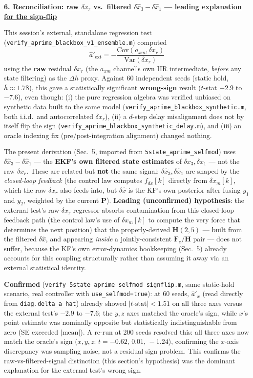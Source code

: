 \documentclass[11pt,a4paper,fontset=none]{ctexart}
\newcommand{\dxh}{\delta\hat x}
\newcommand{\dxr}{\delta x_r}
\newcommand{\hd}[1]{\par\medskip\noindent\underline{\textbf{#1}}\par\nobreak\vspace{0.3ex}}
\begin{document}
\newpage
\hd{6. Reconciliation: raw $\dxr$ vs.\ filtered $\dxh_3-\dxh_1$ --- leading explanation for the sign-flip}
This session's external, standalone regression test (\texttt{verify\_aprime\_blackbox\_v1\_ensemble.m}) computed
\[ \hat a'_{\text{ext}} = -\frac{\mathrm{Cov}(a_{xm},\dxr)}{\mathrm{Var}(\dxr)} \]
using the \textbf{raw} residual $\dxr$ (the $a_{xm}$ channel's own IIR intermediate, \emph{before} any state filtering) as the $\Delta h$ proxy. Against 60 independent seeds (static hold, $\bar h\approx1.78$), this gave a statistically significant \textbf{wrong-sign} result ($t$-stat $-2.9$ to $-7.6$), even though: (i) the pure regression algebra was verified unbiased on synthetic data built to the same model (\texttt{verify\_aprime\_blackbox\_synthetic.m}, both i.i.d.\ and autocorrelated $\dxr$), (ii) a $d$-step delay misalignment does not by itself flip the sign (\texttt{verify\_aprime\_blackbox\_synthetic\_delay.m}), and (iii) an oracle indexing fix (pre/post-integration alignment) changed nothing.

The present derivation (Sec.~5, imported from \texttt{5state\_aprime\_selfmod}) uses $\dxh_3-\dxh_1$ --- the \textbf{EKF's own filtered state estimates} of $\delta x_3,\delta x_1$ --- not the raw $\dxr$. These are related but \textbf{not} the same signal: $\dxh_3,\dxh_1$ are shaped by the \emph{closed-loop feedback} (the control law computes $f_{dx}[k]$ directly from $\delta x_m[k]$, which the raw $\dxr$ also feeds into, but $\dxh$ is the KF's own posterior after fusing $y_1$ and $y_2$, weighted by the current $\mathbf P$). \textbf{Leading (unconfirmed) hypothesis}: the external test's raw-$\dxr$ regressor absorbs contamination from this closed-loop feedback path (the control law's use of $\delta x_m[k]$ to compute the very force that determines the next position) that the properly-derived $\mathbf H(2,5)$ --- built from the filtered $\dxh$, and appearing \emph{inside} a jointly-consistent $\mathbf F_e/\mathbf H$ pair --- does not suffer, because the KF's own error-dynamics bookkeeping (Sec.~5) already accounts for this coupling structurally rather than assuming it away via an external statistical identity.

\textbf{Confirmed} (\texttt{verify\_5state\_aprime\_selfmod\_signflip.m}, same static-hold scenario, real controller with \texttt{use\_selfmod=true}): at 60 seeds, $\hat a'_x$ (read directly from \texttt{diag.delta\_a\_hat}) already showed $|t\text{-stat}|<1.51$ on all three axes versus the external test's $-2.9$ to $-7.6$; the $y,z$ axes matched the oracle's sign, while $x$'s point estimate was nominally opposite but statistically indistinguishable from zero ($\mathrm{SE}$ exceeded $|\mathrm{mean}|$). A re-run at 200 seeds resolved this: all three axes now match the oracle's sign ($x,y,z$: $t=-0.62,\,0.01,\,-1.24$), confirming the $x$-axis discrepancy was sampling noise, not a residual sign problem. This confirms the raw-vs-filtered-signal distinction (this section's hypothesis) was the dominant explanation for the external test's wrong sign.
\end{document}
